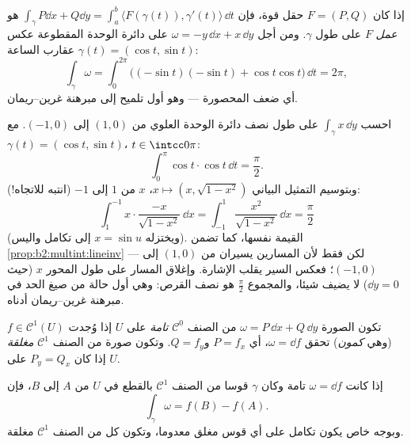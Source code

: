 \begin{example}\label{ex:b2:multint:work}
إذا كان $F = (P, Q)$ حقل قوة، فإن $\int_\gamma P\dd x + Q\dd y =
\int_a^b \langle F(\gamma(t)), \gamma'(t)\rangle\,\dd t$ هو \emph{عمل} $F$ على طول
$\gamma$. ومن أجل $\omega = -y\,\dd x +
x\,\dd y$ على دائرة الوحدة المقطوعة عكس عقارب الساعة
$\gamma(t) =
(\cos t, \sin t)$:
\[
\int_\gamma \omega
= \int_0^{2\pi}\bigl((-\sin t)(-\sin t)
+ \cos t\cos t\bigr)\,\dd t = 2\pi ,
\]
أي ضعف  المحصورة --- وهو أول تلميح إلى مبرهنة غرين--ريمان.
\end{example}

\begin{example}\label{ex:b2:multint:semicircle}
احسب $\int_\gamma x\,\dd y$ على طول نصف دائرة الوحدة العلوي من $(1, 0)$ إلى $(-1, 0)$. مع
$\gamma(t) =
(\cos t, \sin t)$، $t \in \intcc0\pi$:
\[
\int_0^\pi\cos t\cdot\cos t\,\dd t = \frac\pi2 .
\]
وبتوسيم التمثيل البياني $x \mapsto (x, \sqrt{1 -
x^2})$، $x$ من $1$ إلى $-1$ (انتبه
للاتجاه!):
\[
\int_1^{-1}x\cdot\frac{-x}{\sqrt{1 - x^2}}\,\dd x
= \int_{-1}^{1}\frac{x^2}{\sqrt{1 - x^2}}\,\dd x
= \frac\pi2
\]
(ويختزله $x = \sin u$ إلى تكامل واليس). القيمة نفسها، كما تضمن \cref{prop:b2:multint:lineinv} ---
لكن فقط لأن المسارين يسيران من $(1,0)$ إلى $(-1,0)$؛ فعكس السير يقلب
الإشارة. وإغلاق المسار على طول المحور $x$ (حيث $\dd y = 0$) لا يضيف
شيئا، والمجموع $\frac\pi2$ هو  نصف القرص: وهي أول حالة من صيغ 
الحد في مبرهنة غرين--ريمان أدناه.
\end{example}

\begin{definition}\label{def:b2:multint:exact}
تكون الصورة $\omega = P\,\dd x + Q\,\dd y$ من الصنف $\mathcal{C}^0$ \emph{تامة} على
$U$ إذا وُجدت $f \in \mathcal{C}^1(U)$ (وهي \emph{كمون}) تحقق $\omega = \dd f$،
أي $P = f_x$ و$Q
= f_y$. وتكون صورة من الصنف $\mathcal{C}^1$ \emph{مغلقة}
إذا كان $P_y = Q_x$ على $U$.
\end{definition}

\begin{theorem}\label{thm:b2:multint:ftc}
إذا كانت $\omega = \dd f$ تامة وكان $\gamma$ قوسا من الصنف $\mathcal{C}^1$ بالقطع في
$U$ من $A$ إلى $B$، فإن
\[
\int_\gamma \omega = f(B) - f(A) .
\]
وبوجه خاص يكون تكامل  على أي قوس مغلق معدوما، وتكون كل  من الصنف $\mathcal{C}^1$ مغلقة.
\end{theorem}

